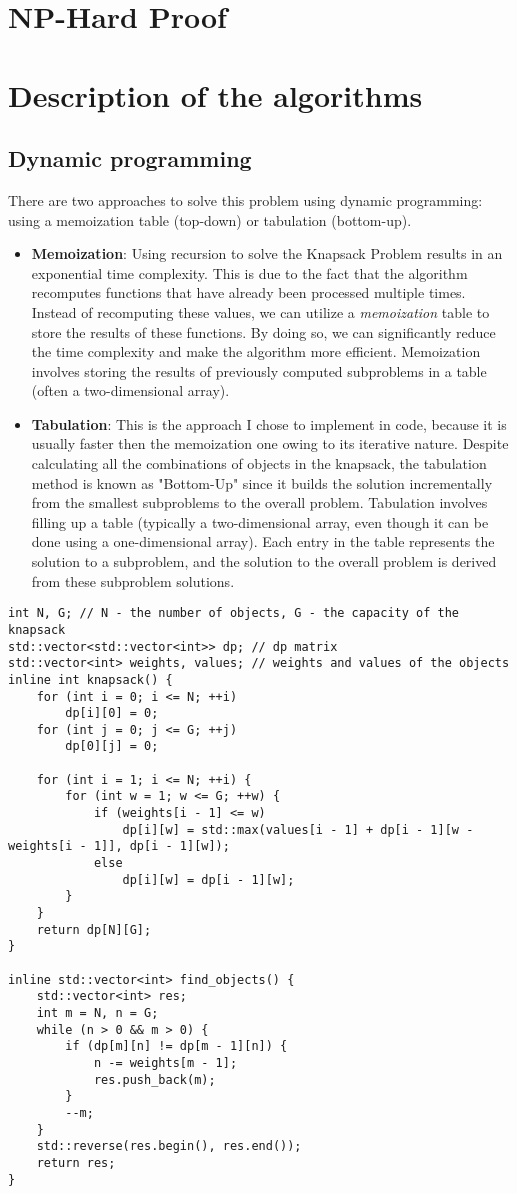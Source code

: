 \documentclass[runningheads]{llncs}
\begin{document}
\section{NP-Hard Proof}

\section{Description of the algorithms}
\subsection{Dynamic programming}
There are two approaches to solve this problem using dynamic programming:
using a memoization table (top-down) or tabulation (bottom-up). 
\begin{itemize}
    \item \textbf{Memoization}: Using recursion to solve the Knapsack Problem results in an exponential
	time complexity. This is due to the fact that the algorithm recomputes functions that have already
	been processed multiple times. Instead of recomputing these values, we can utilize a \textit{memoization}
	table to store the results of these functions. By doing so, we can significantly reduce the time complexity and make the algorithm more efficient. Memoization involves storing the results of previously computed subproblems in a table (often a two-dimensional array).
    \item \textbf{Tabulation}: This is the approach I chose to implement in code, because it is usually
	faster then the memoization one owing to its iterative nature. Despite calculating all the
	combinations of objects in the knapsack, the tabulation method is known as "Bottom-Up" since
	it builds the solution incrementally from the smallest subproblems to the overall problem.
	Tabulation involves filling up a table (typically a two-dimensional array, even though it can be
	done using a one-dimensional array). Each entry in the table represents the solution to a subproblem,
	and the solution to the overall problem is derived from these subproblem solutions.
\end{itemize}

\begin{lstlisting}
int N, G; // N - the number of objects, G - the capacity of the knapsack
std::vector<std::vector<int>> dp; // dp matrix
std::vector<int> weights, values; // weights and values of the objects
inline int knapsack() {
	for (int i = 0; i <= N; ++i)
		dp[i][0] = 0;
	for (int j = 0; j <= G; ++j)
		dp[0][j] = 0;

	for (int i = 1; i <= N; ++i) {
		for (int w = 1; w <= G; ++w) {
			if (weights[i - 1] <= w)
				dp[i][w] = std::max(values[i - 1] + dp[i - 1][w - weights[i - 1]], dp[i - 1][w]);
			else
				dp[i][w] = dp[i - 1][w];
		}
	}
	return dp[N][G];
}

inline std::vector<int> find_objects() {
	std::vector<int> res;
	int m = N, n = G;
	while (n > 0 && m > 0) {
		if (dp[m][n] != dp[m - 1][n]) {
			n -= weights[m - 1];
			res.push_back(m);
		}
		--m;
	}
	std::reverse(res.begin(), res.end());
	return res;
}
\end{lstlisting}
\end{document}

